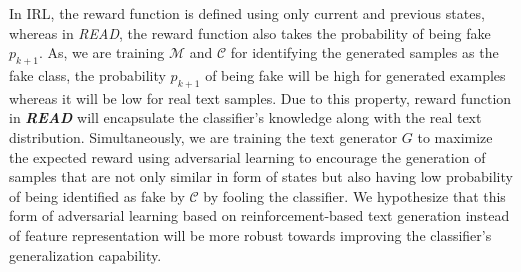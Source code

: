 \documentclass[11pt]{article}
\begin{document}
In IRL, the reward function is defined using only current and previous states, whereas in \textit{READ}, the reward function also takes the probability of being fake $p_{k+1}$. As, we are training  $\mathcal{M}$ and $\mathcal{C}$ for identifying the generated samples as the fake class, the probability $p_{k+1}$ of being fake will be high for generated examples whereas it will be low for real text samples. Due to this property, reward function in \textit{\textbf{READ}} will encapsulate the classifier's knowledge along with the real text distribution. Simultaneously, we are training the text generator $G$ to maximize the expected reward using adversarial learning to encourage the generation of samples that are not only  similar in form of states but also having low probability of being identified as fake by $\mathcal{C}$ by fooling the classifier. We hypothesize that this form of adversarial learning based on reinforcement-based text generation instead of feature representation will be more robust towards improving the classifier's generalization capability.


\end{document}
